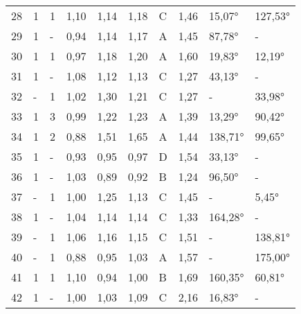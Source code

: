 \begin{longtable}{p{0.7cm}p{1.4cm}p{1.4cm}p{1cm}p{1cm}p{1cm}p{1cm}p{1cm}p{1cm}p{1cm}}
\small{28} & \small{1} & \small{1} & \small{1,10} & \small{1,14} & \small{1,18} & \small{C} & \small{1,46} & \small{15,07°} & \small{127,53°}\\
\small{29} & \small{1} & \small{-} & \small{0,94} & \small{1,14} & \small{1,17} & \small{A} & \small{1,45} & \small{87,78°} & \small{-}\\
\small{30} & \small{1} & \small{1} & \small{0,97} & \small{1,18} & \small{1,20} & \small{A} & \small{1,60} & \small{19,83°} & \small{12,19°}\\
\small{31} & \small{1} & \small{-} & \small{1,08} & \small{1,12} & \small{1,13} & \small{C} & \small{1,27} & \small{43,13°} & \small{-}\\
\small{32} & \small{-} & \small{1} & \small{1,02} & \small{1,30} & \small{1,21} & \small{C} & \small{1,27} & \small{-} & \small{33,98°}\\
\small{33} & \small{1} & \small{3} & \small{0,99} & \small{1,22} & \small{1,23} & \small{A} & \small{1,39} & \small{13,29°} & \small{90,42°}\\
\small{34} & \small{1} & \small{2} & \small{0,88} & \small{1,51} & \small{1,65} & \small{A} & \small{1,44} & \small{138,71°} & \small{99,65°}\\
\small{35} & \small{1} & \small{-} & \small{0,93} & \small{0,95} & \small{0,97} & \small{D} & \small{1,54} & \small{33,13°} & \small{-}\\
\small{36} & \small{1} & \small{-} & \small{1,03} & \small{0,89} & \small{0,92} & \small{B} & \small{1,24} & \small{96,50°} & \small{-}\\
\small{37} & \small{-} & \small{1} & \small{1,00} & \small{1,25} & \small{1,13} & \small{C} & \small{1,45} & \small{-} & \small{5,45°}\\
\small{38} & \small{1} & \small{-} & \small{1,04} & \small{1,14} & \small{1,14} & \small{C} & \small{1,33} & \small{164,28°} & \small{-}\\
\small{39} & \small{-} & \small{1} & \small{1,06} & \small{1,16} & \small{1,15} & \small{C} & \small{1,51} & \small{-} & \small{138,81°}\\
\small{40} & \small{-} & \small{1} & \small{0,88} & \small{0,95} & \small{1,03} & \small{A} & \small{1,57} & \small{-} & \small{175,00°}\\
\small{41} & \small{1} & \small{1} & \small{1,10} & \small{0,94} & \small{1,00} & \small{B} & \small{1,69} & \small{160,35°} & \small{60,81°}\\
\small{42} & \small{1} & \small{-} & \small{1,00} & \small{1,03} & \small{1,09} & \small{C} & \small{2,16} & \small{16,83°} & \small{-}\\

\end{longtable}
